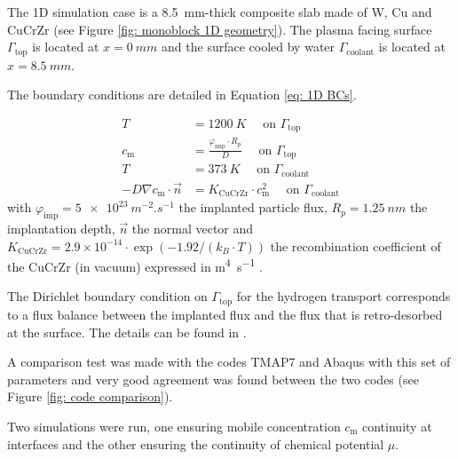 The 1D simulation case is a \SI{8.5}{mm}-thick composite slab made of W, Cu and CuCrZr (see Figure \ref{fig: monoblock 1D geometry}).
The plasma facing surface $\Gamma_\mathrm{top}$ is located at $x=\SI{0}{mm}$ and the surface cooled by water $\Gamma_\mathrm{coolant}$ is located at $x=\SI{8.5}{mm}$.


The boundary conditions are detailed in Equation \ref{eq: 1D BCs}.

\begin{subequations}
    \begin{align}
    T &= \SI{1200}{K}\quad \text { on } \Gamma_\mathrm{top}\\
    c_\mathrm{m} &=  \frac{\varphi_\mathrm{imp} \cdot R_p}{D} \quad \text { on } \Gamma_\mathrm{top}\\
    T &= \SI{373}{K} \quad \text { on } \Gamma_\mathrm{coolant}\\
    -D \nabla c_\mathrm{m} \cdot \vec{n} &= K_\mathrm{CuCrZr} \cdot c_\mathrm{m}^{2} \quad \text { on } \Gamma_\mathrm{coolant}  
    \end{align}
    \label{eq: 1D BCs}
\end{subequations}
with $\varphi_\mathrm{imp} = \SI{5e23}{m^{-2}.s^{-1}}$ the implanted particle flux, $R_p = \SI{1.25}{nm}$ the implantation depth, $\vec{n}$ the normal vector and $K_\mathrm{CuCrZr} = 2.9 \times 10^{-14}\cdot \exp{(-1.92/(k_B\cdot T))}$ the recombination coefficient of the CuCrZr (in vacuum) expressed in \si{m^4.s^{-1}} .

The Dirichlet boundary condition on $\Gamma_\mathrm{top}$ for the hydrogen transport corresponds to a flux balance between the implanted flux and the flux that is retro-desorbed at the surface.
The details can be found in .

A comparison test was made with the codes TMAP7 and Abaqus with this set of parameters and very good agreement was found between the two codes (see Figure \ref{fig: code comparison}).



Two simulations were run, one ensuring mobile concentration $c_\mathrm{m}$ continuity at interfaces and the other ensuring the continuity of chemical potential $\mu$.

